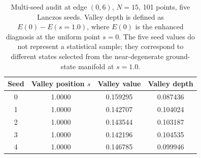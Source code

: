\documentclass[aps,prb,reprint,superscriptaddress]{revtex4-2}
\begin{document}
\begin{table}[h]
\centering
\caption{Multi-seed audit at edge $(0,6)$, $N=15$, 101 points, five Lanczos seeds. Valley depth is defined as $E(0)-E(s=1.0)$, where $E(0)$ is the enhanced diagnosis at the uniform point $s=0$. The five seed values do not represent a statistical sample; they correspond to different states selected from the near-degenerate ground-state manifold at $s=1.0$.}
\label{tab:l2_valley}
\begin{tabular}{cccc}
\toprule
Seed & Valley position $s$ & Valley value & Valley depth \\
\midrule
0 & 1.0000 & 0.159295 & 0.087436 \\
1 & 1.0000 & 0.142707 & 0.104024 \\
2 & 1.0000 & 0.143544 & 0.103187 \\
3 & 1.0000 & 0.142196 & 0.104535 \\
4 & 1.0000 & 0.146785 & 0.099946 \\
\bottomrule
\end{tabular}
\end{table}
\end{document}
